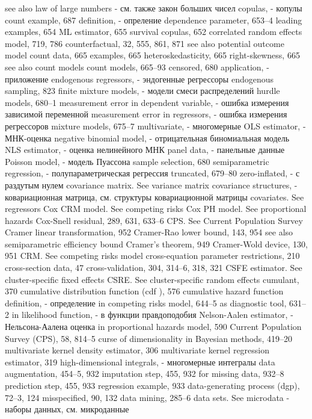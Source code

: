 see also law of large numbers - см. также закон больших чисел
copulas, - копулы
count example, 687 
definition, - опреление
dependence parameter, 653–4 leading examples, 654
ML estimator, 655
survival copulas, 652
correlated random effects model, 719, 786 counterfactual, 32, 555, 861, 871
see also potential outcome model count data, 665
examples, 665 heteroskedasticity, 665 right-skewness, 665 see also count models
count models, 665–93
censored, 680
application, - приложение
endogenous regressors, - эндогенные регрессоры 
endogenous sampling, 823
finite mixture models, - модели смеси распределений
hurdle models, 680–1
measurement error in dependent variable, - ошибка измерения зависимой переменной 
measurement error in regressors, - ошибка измерения регрессоров 
mixture models, 675–7
multivariate, - многомерные
OLS estimator, - МНК-оценка
negative binomial model, - отрицательная биномиальная модель
NLS estimator, - оценка нелинейного МНК
panel data, - панельные данные
Poisson model, - модель Пуассона
sample selection, 680
semiparametric regression, - полупараметрическая регрессия
truncated, 679–80
zero-inflated, - с раздутым нулем
covariance matrix. See variance matrix covariance structures, - ковариационная матрица, см. структуры ковариационной матрицы 
covariates. See regressors
Cox CRM model. See competing risks
Cox PH model. See proportional hazards Cox-Snell residual, 289, 631, 633–6 CPS. See Current Population Survey Cramer linear transformation, 952 Cramer-Rao lower bound, 143, 954
see also semiparametric efficiency bound Cramer’s theorem, 949
Cramer-Wold device, 130, 951
CRM. See competing risks model cross-equation parameter restrictions, 210 cross-section data, 47
cross-validation, 304, 314–6, 318, 321
CSFE estimator. See cluster-specific fixed effects CSRE. See cluster-specific random effects cumulant, 370
cumulative distribution function (cdf ), 576 cumulative hazard function
definition, - определение
in competing risks model, 644–5
as diagnostic tool, 631–2
in likelihood function, - в функции правдоподобия
Nelson-Aalen estimator, - Нельсона-Аалена оценка 
in proportional hazards model, 590
Current Population Survey (CPS), 58, 814–5 curse of dimensionality
in Bayesian methods, 419–20
multivariate kernel density estimator, 306 multivariate kernel regression estimator, 319 
high-dimensional integrals, - многомерные интегралы
data augmentation, 454–5, 932 imputation step, 455, 932 for missing data, 932–8 prediction step, 455, 933 regression example, 933
data-generating process (dgp), 72–3, 124 misspecified, 90, 132
data mining, 285–6
data sets. See microdata - наборы данных, см. микроданные

